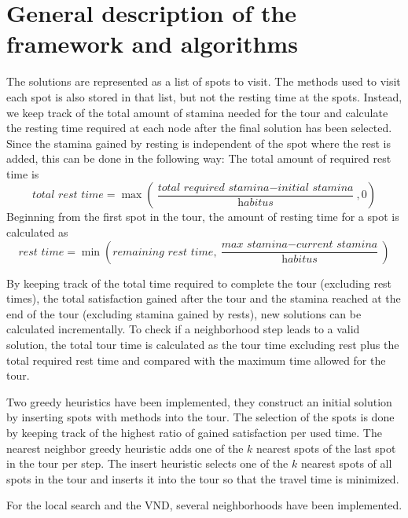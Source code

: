 \documentclass{article}
\begin{document}
\section{General description of the framework and algorithms}

The solutions are represented as a list of spots to visit. The methods used to visit each spot is also stored in that list, but not the
resting time at the spots. Instead, we keep track of the total amount of stamina needed for the tour and calculate the resting time required 
at each node after the final solution has been selected. 
Since the stamina gained by resting is independent of the spot where the rest is added, this can be done in the following way: 
The total amount of required rest time is 
\[
\textit{total rest time} = \max\left(\frac{\textit{total required stamina} - \textit{initial stamina}}{\textit{habitus}},0\right)
\]
Beginning from the first spot in the tour, the amount of resting time for a spot is calculated as
\[
\textit{rest time} = \min\left(\textit{remaining rest time}, \frac{\textit{max stamina} - \textit{current stamina}}{\textit{habitus}}\right)
\]

By keeping track of the total time required to complete the tour (excluding rest times), the total satisfaction gained after the tour and
the stamina reached at the end of the tour (excluding stamina gained by rests), new solutions can be calculated incrementally. 
To check if a neighborhood step leads to a valid solution, the total tour time is calculated as the tour time excluding rest plus
the total required rest time and compared with the maximum time allowed for the tour.
\medskip

Two greedy heuristics have been implemented, they construct an initial solution by inserting spots with methods into the tour. The selection of the spots is done by keeping track of the highest ratio of gained satisfaction per used time. The nearest neighbor greedy heuristic adds one of the $k$ nearest spots of the last spot in the tour per step. The insert
heuristic selects one of the $k$ nearest spots of all spots in the tour and inserts it into the tour so that the travel time is minimized.
\medskip

For the local search and the VND, several neighborhoods have been implemented. 

\end{document}
